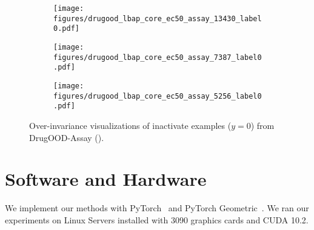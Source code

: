 \begin{figure}[h]
    \centering
    \begin{subfigure}{0.31\textwidth}
        \centering
        \texttt{[image: figures/drugood\_lbap\_core\_ec50\_assay\_13430\_label0.pdf]}
    \end{subfigure}
    \begin{subfigure}{0.31\textwidth}
        \centering
        \texttt{[image: figures/drugood\_lbap\_core\_ec50\_assay\_7387\_label0.pdf]}
    \end{subfigure}
    \begin{subfigure}{0.31\textwidth}
        \centering
        \texttt{[image: figures/drugood\_lbap\_core\_ec50\_assay\_5256\_label0.pdf]}
    \end{subfigure}
    \caption{Over-invariance visualizations of inactivate examples ($y=0$) from DrugOOD-Assay (\cite{ciga}).}
    \label{fig:assay_viz_inact_appdx}
\end{figure}

\section{Software and Hardware}
We implement our methods with PyTorch~\citep{pytorch} and PyTorch Geometric~\citep{pytorch_geometric}. We ran our experiments
on Linux Servers installed with 3090 graphics cards and CUDA 10.2.




